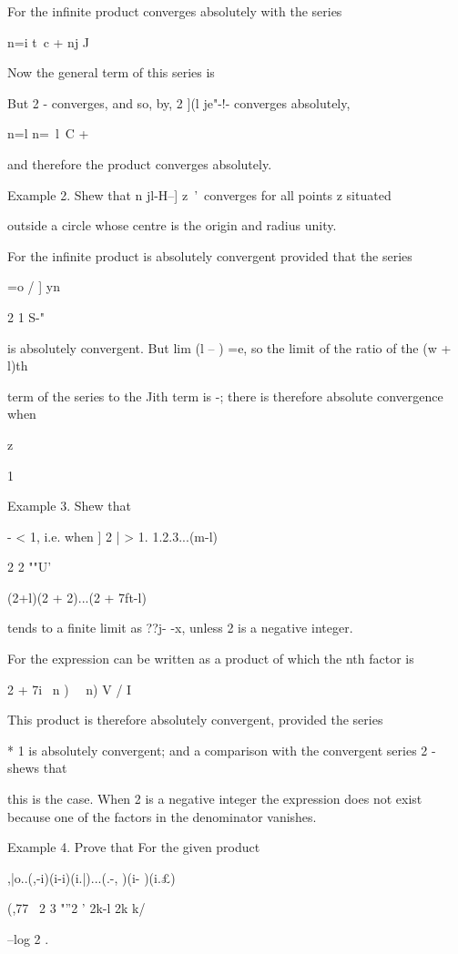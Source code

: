 For the infinite product converges absolutely with the series

n=i t\ c + nj J

%
%

Now the general term of this series is

But 2 - converges, and so, by, 2 ](l je"-!- converges
absolutely,

n=l n=\ l\ C + %

and therefore the product converges absolutely.

Example 2. Shew that n jl-H--] z~'\ converges for all points z
situated

outside a circle whose centre is the origin and radius unity.

For the infinite product is absolutely convergent provided that the
series

=o / ] yn

2 1 S-"

is absolutely convergent. But lim (l -- ) =e, so the limit of the
ratio of the (w + l)th

term of the series to the Jith term is -; there is therefore absolute
convergence when

z

1

Example 3. Shew that

- < 1, i.e. when ] 2 | > 1. 1.2.3...(m-l)

2 2 ""U'

(2+l)(2 + 2)...(2 + 7ft-l)

tends to a finite limit as ??j- -x, unless 2 is a negative integer.

For the expression can be written as a product of which the nth factor
is

2 + 7i \ n ) ~\ n) V / I

This product is therefore absolutely convergent, provided the series

* 1 is absolutely convergent; and a comparison with the convergent
series 2 - shews that

this is the case. When 2 is a negative integer the expression does not
exist because one of the factors in the denominator vanishes.

Example 4. Prove that For the given product

,|o..(,-i)(i-i)(i.|)...(.-, )(i- )(i.£)

(,77 \ 2 3 "''2 ' 2k-l 2k k/

--log 2 .

